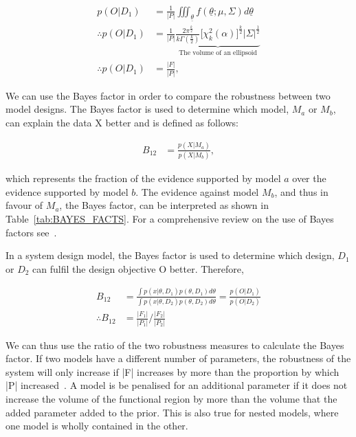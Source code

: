 \begin{align}
p(O|D_1) &= \frac{1}{|P|}\iiint_{\underline{\theta}}f(\underline{\theta};\mu,\Sigma)d\underline{\theta} \\%
\therefore p(O|D_1) &= \frac{1}{|P|}\underbrace{\frac{2\pi^{\frac{k}{2}}}{k\Gamma(\frac{k}{2})} \Big[ \chi _{k}^{2}(\alpha) \Big]^{\frac{k}{2}} |\Sigma|^\frac{1}{2}}_{\text{The volume of an ellipsoid}} \\
\therefore p(O|D_1) &= \frac{|F|}{|P|},
\end{align}



\noindent We can use the Bayes factor in order to compare the robustness between two model designs. The Bayes factor is used to determine which model, $M_a$ or $M_b$, can explain the data X better and is defined as follows:

\begin{align}
 B_{12} &= \frac{p(X|M_a)}{p(X|M_b)}, \label{eq:final_bayes1}
\end{align}	

\noindent which represents the fraction of the evidence supported by model $a$ over the evidence supported by model $b$. The evidence against model $M_b$, and thus in favour of $M_a$, the Bayes factor, can be interpreted as shown in Table~\ref{tab:BAYES_FACTS}. For a comprehensive review on the use of Bayes factors see~\textcite{Kass:1995vb}.


In a system design model, the Bayes factor is used to determine which design, $D_1$ or $D_2$ can fulfil the design objective O better. Therefore,


\begin{align}
B_{12} &= \frac{\displaystyle \int p(x|\theta, D_1)p(\theta, D_1)d\theta}{\displaystyle \int p(x|\theta, D_2)p(\theta, D_2)d\theta} = \frac{p(O|D_1)}{p(O|D_2)}\\
\therefore B_{12} &= \frac{|F_1|}{|P_1|} / \frac{|F_2|}{|P_2|} \label{eq:final_bayes}
\end{align}

\noindent We can thus use the ratio of the two robustness measures to calculate the Bayes factor. If two models have a different number of parameters, the robustness of the system will only increase if |F| increases by more than the proportion by which |P| increased~\autocite{Woods:2016eh}. A model is be penalised for an additional parameter if it does not increase the volume of the functional region by more than the volume that the added parameter added to the prior. This is also true for nested models, where one model is wholly contained in the other. 


